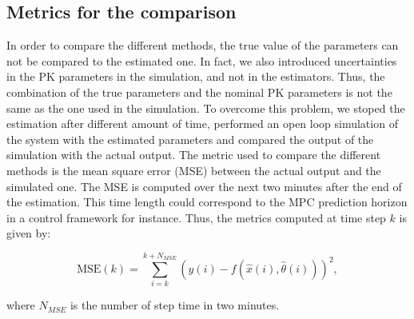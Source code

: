 \subsection{Metrics for the comparison}

In order to compare the different methods, the true value of the parameters can not be compared to the estimated one. In fact, we also introduced uncertainties in the PK parameters in the simulation, and not in the estimators. Thus, the combination of the true parameters and the nominal PK parameters is not the same as the one used in the simulation. To overcome this problem, we stoped the estimation after different amount of time, performed an open loop simulation of the system with the estimated parameters and compared the output of the simulation with the actual output. The metric used to compare the different methods is the mean square error (MSE) between the actual output and the simulated one. The MSE is computed over the next two minutes after the end of the estimation. This time length could correspond to the MPC prediction horizon in a control framework for instance. Thus, the metrics computed at time step $k$ is given by:

\begin{equation}
    \text{MSE}(k) = \sum_{i=k}^{k+N_{MSE}} (y(i) - f(\hat{x}(i), \hat{\theta}(i)))^2,
\end{equation}

where $N_{MSE}$ is the number of step time in two minutes. \medskip

